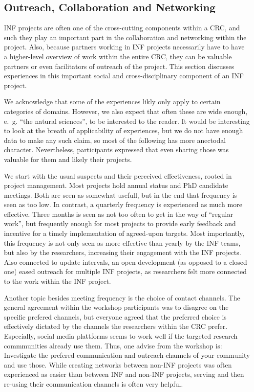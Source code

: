 \documentclass{eceasst}
\begin{document}
\subsection{Outreach, Collaboration and Networking}
INF projects are often one of the cross-cutting components within a CRC, and such they play an important part in the collaboration and networking within the project.
Also, because partners working in INF projects necessarily have to have a higher-level overview of work within the entire CRC, they can be valuable partners or even facilitators of outreach of the project.
This section discusses experiences in this important social and cross-disciplinary component of an INF project.

We acknowledge that some of the experiences likly only apply to certain categories of domains.
However, we also expect that often these are wide enough, e. g. “the natural sciences”, to be interested to the reader.
It would be interesting to look at the breath of applicability of experiences, but we do not have enough data to make any such claim, so most of the following has more anectodal character.
Nevertheless, participants expressed that even sharing those was valuable for them and likely their projects.

We start with the usual suspects and their perceived effectiveness, rooted in project management.
Most projects hold annual status and PhD candidate meetings.
Both are seen as somewhat usefull, but in the end that frequency is seen as too low.
In contrast, a quarterly frequency is experienced as much more effective.
Three months is seen as not too often to get in the way of “regular work”, but frequently enough for most projects to provide early feedback and incentive for a timely implementation of agreed-upon targets.
Most importantly, this frequency is not only seen as more effective than yearly by the INF teams, but also by the researchers, increasing their engagement with the INF projects.
Also connected to update intervals, an open development (as opposed to a closed one) eased outreach for multiple INF projects, as researchers felt more connected to the work within the INF project.

Another topic besides meeting frequency is the choice of contact channels.
The general agreement within the workshop participants was to disagree on the specific prefered channels, but everyone agreed that the preferred choice is effectively dictated by the channels the researchers within the CRC prefer.
Especially, social media plattforms seems to work well if the targeted research commmunities already use them.
Thus, one advise from the workshop is: Investigate the prefered communication and outreach channels of your community and use those.
While creating networks between non-INF projects was often experienced as easier than between INF and non-INF projects, serving and then re-using their communication channels is often very helpful.
\end{document}
